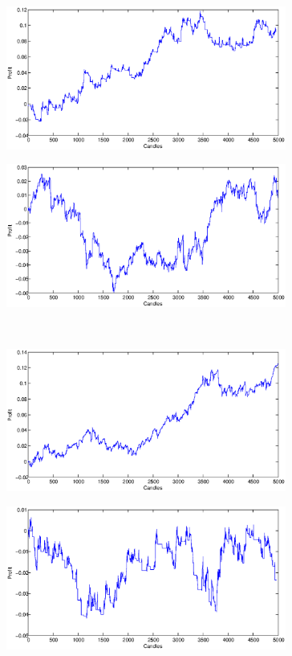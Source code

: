 \documentclass{tewiart}
\begin{document}
\begin{figure}[h]
\centering
\begin{minipage}{.49\linewidth}
\centering 
\includegraphics[width=0.82\textwidth]{images/S1a_eurusd.eps}
\label{jedno}
\end{minipage}
\begin{minipage}{.49\linewidth}
\centering 
\includegraphics[width=0.82\textwidth]{images/S1b_eurusd.eps}
\label{dwu}
\end{minipage}
\\
\begin{minipage}{.49\linewidth}
\centering 
\includegraphics[width=0.82\textwidth]{images/S1c_eurusd.eps}
\label{cztero}
\end{minipage}
\begin{minipage}{.49\linewidth}
\centering 
\includegraphics[width=0.82\textwidth]{images/S1d_eurusd.eps}

\end{minipage}
\end{figure}
\end{document}

